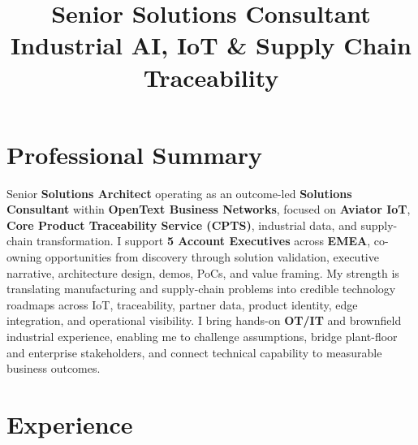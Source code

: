 \documentclass[11pt,a4paper,sans]{moderncv}
\title{Senior Solutions Consultant \\ Industrial AI, IoT \& Supply Chain Traceability}
\newcommand{\atsinvisible}[1]{%
  \makebox[0pt][l]{\textcolor{white}{#1}}%
}
\newcommand{\kw}[1]{\textbf{#1}}
\begin{document}
\makecvtitle
\atsinvisible{LinkedIn:https://www.linkedin.com/in/ankitseal}
\atsinvisible{Github:https://github.com/ankitseal}
\vspace*{-1.5\baselineskip}

\section{Professional Summary}
\begin{justify}
Senior \kw{Solutions Architect} operating as an outcome-led \kw{Solutions Consultant} within \kw{OpenText Business Networks}, focused on \kw{Aviator IoT}, \kw{Core Product Traceability Service (CPTS)}, industrial data, and supply-chain transformation. I support \kw{5 Account Executives} across \kw{EMEA}, co-owning opportunities from discovery through solution validation, executive narrative, architecture design, demos, PoCs, and value framing. My strength is translating manufacturing and supply-chain problems into credible technology roadmaps across IoT, traceability, partner data, product identity, edge integration, and operational visibility. I bring hands-on \kw{OT/IT} and brownfield industrial experience, enabling me to challenge assumptions, bridge plant-floor and enterprise stakeholders, and connect technical capability to measurable business outcomes.
\end{justify}

\section{Experience}
\end{document}
